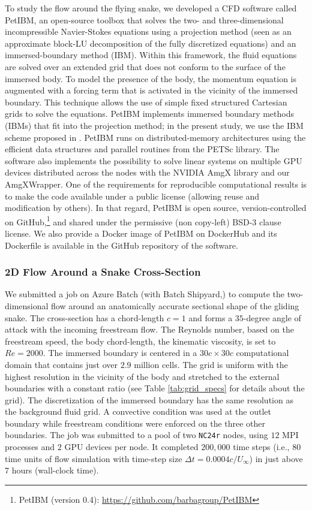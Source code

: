 \documentclass[10pt,journal,compsoc]{IEEEtran}
\begin{document}
To study the flow around the flying snake, we developed a CFD software called PetIBM\cite{chuang_et_al_2018}, an open-source toolbox that solves the two- and three-dimensional incompressible Navier-Stokes equations using a projection method (seen as an approximate block-LU decomposition of the fully discretized equations\cite{perot_1993}) and an immersed-boundary method (IBM).
Within this framework, the fluid equations are solved over an extended grid that does not conform to the surface of the immersed body.
To model the presence of the body, the momentum equation is augmented with a forcing term that is activated in the vicinity of the immersed boundary.
This technique allows the use of simple fixed structured Cartesian grids to solve the equations.
PetIBM implements immersed boundary methods (IBMs) that fit into the projection method; in the present study, we use the IBM scheme proposed in \cite{li_et_al_2016}.
PetIBM runs on distributed-memory architectures using the efficient data structures and parallel routines from the PETSc library.
The software also implements the possibility to solve linear systems on multiple GPU devices distributed across the nodes with the NVIDIA AmgX library and our AmgXWrapper\cite{chuang_barba_2017}.
One of the requirements for reproducible computational results is to make the code available under a public license (allowing reuse and modification by others).
In that regard, PetIBM is open source, version-controlled on GitHub,\footnote{PetIBM (version 0.4): \url{https://github.com/barbagroup/PetIBM}} and shared under the permissive (non copy-left) BSD-3 clause license.
We also provide a Docker image of PetIBM on DockerHub and its Dockerfile is available in the GitHub repository of the software.

\subsubsection{2D Flow Around a Snake Cross-Section}

We submitted a job on Azure Batch (with Batch Shipyard,) to compute the two-dimensional flow around an anatomically accurate sectional shape of the gliding snake.
The cross-section has a chord-length $c=1$ and forms a $35$-degree angle of attack with the incoming freestream flow.
The Reynolds number, based on the freestream speed, the body chord-length, the kinematic viscosity, is set to $Re=2000$.
The immersed boundary is centered in a $30c \times 30c$ computational domain that contains just over $2.9$ million cells.
The grid is uniform with the highest resolution in the vicinity of the body and stretched to the external boundaries with a constant ratio (see Table \ref{tab:grid_specs} for details about the grid).
The discretization of the immersed boundary has the same resolution as the background fluid grid.
A convective condition was used at the outlet boundary while freestream conditions were enforced on the three other boundaries.
The job was submitted to a pool of two \texttt{NC24r} nodes, using $12$ MPI processes and $2$ GPU devices per node.
It completed $200,000$ time steps (i.e., $80$ time units of flow simulation with time-step size $\Delta t = 0.0004 c / U_\infty$) in just above $7$ hours (wall-clock time).
\end{document}

